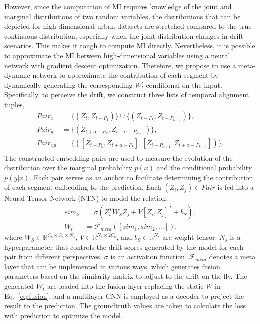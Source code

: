 \documentclass[sigconf]{acmart}
\begin{document}
However, since the computation of MI requires knowledge of the joint and marginal distributions of two random variables, the distributions that can be depicted for high-dimensional urban datasets are stretched compared to the true continuous distribution, especially when the joint distribution changes in drift scenarios. This makes it tough to compute MI directly. Nevertheless, it is possible to approximate the MI between high-dimensional variables using a neural network with gradient descent optimization\cite{belghazi2018mine}. Therefore, we propose to use a meta-dynamic network to approximate the contribution of each segment by dynamically generating the corresponding $W_t^i$ conditional on the input. Specifically, to perceive the drift, we construct three lists of temporal alignment tuples,
\begin{equation}
\begin{aligned}
    Pair_x &= \{(\mathit{Z}_t,\mathit{Z}_{t-P_1})\}\cup\{(\mathit{Z}_{t-P_k},\mathit{Z}_{t-P_{k+1}})\}, \\
    Pair_y &= \{(\mathit{Z}_{t+\alpha-P_k},\mathit{Z}_{t+\alpha-P_{k+1}})\}, \\
    Pair_{xy} &= \{([\mathit{Z}_{t-P_k}, \mathit{Z}_{t+\alpha-P_{k}}], [\mathit{Z}_{t-P_{k+1}}, \mathit{Z}_{t+\alpha-P_{k+1}}])\}. \\
\end{aligned}
\end{equation}
The constructed embedding pairs are used to measure the evolution of the distribution over the marginal probability $p(x)$ and the conditional probability $p(y|x)$. Each pair serves as an anchor to facilitate determining the contribution of each segment embedding to the prediction. Each $(\mathit{Z}_i,\mathit{Z}_j)\in Pair$ is fed into a Neural Tensor Network (NTN) \cite{socher2013reasoning} to model the relation:
\begin{equation}
\begin{aligned}
    sim_k & = \sigma(\mathit{Z}_{i}^{T}W_S\mathit{Z}_{j} + V[\mathit{Z}_{i}, \mathit{Z}_{j}]^{T} + b_S),\\
    W_t &= \mathcal{F}_{meta}([sim_1, sim_2, ...]),
\end{aligned}
\label{eq:adapW}
\end{equation}
where $W_S\in\mathbb{R}^{C_e\times C_e\times N_s}$, $V\in\mathbb{R}^{N_s\times 2C_e}$, and $b_S\in \mathbb{R}^{N_s}$ are weight tensor. $N_s$ is a hyperparameter that controls the drift scores generated by the model for each pair from different perspectives. $\sigma$ is an activation function. $\mathcal{F}_{meta}$ denotes a meta layer that can be implemented in various ways, which generates fusion parameters based on the similarity matrix to adjust to the drift on-the-fly. The generated $W_t$ are loaded into the fusion layer replacing the static $W$ in Eq.~\ref{eq:fusion}, and a multilayer CNN is employed as a decoder to project the result to the prediction. The groundtruth values are taken to calculate the loss with prediction to optimize the model. 
\end{document}

